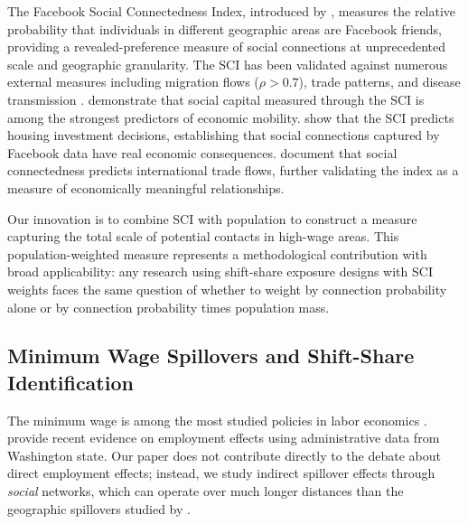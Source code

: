 \documentclass[12pt]{article}
\begin{document}
The Facebook Social Connectedness Index, introduced by \citet{bailey2018social}, measures the relative probability that individuals in different geographic areas are Facebook friends, providing a revealed-preference measure of social connections at unprecedented scale and geographic granularity. The SCI has been validated against numerous external measures including migration flows ($\rho > 0.7$), trade patterns, and disease transmission \citep{bailey2020social}. \citet{chetty2022social} demonstrate that social capital measured through the SCI is among the strongest predictors of economic mobility. \citet{bailey2018house} show that the SCI predicts housing investment decisions, establishing that social connections captured by Facebook data have real economic consequences. \citet{bailey2022social} document that social connectedness predicts international trade flows, further validating the index as a measure of economically meaningful relationships.

Our innovation is to combine SCI with population to construct a measure capturing the total scale of potential contacts in high-wage areas. This population-weighted measure represents a methodological contribution with broad applicability: any research using shift-share exposure designs with SCI weights faces the same question of whether to weight by connection probability alone or by connection probability times population mass.

\subsection{Minimum Wage Spillovers and Shift-Share Identification}

The minimum wage is among the most studied policies in labor economics \citep{neumark2007minimum, dube2010minimum, cengiz2019effect}. \citet{jardim2024} provide recent evidence on employment effects using administrative data from Washington state. Our paper does not contribute directly to the debate about direct employment effects; instead, we study indirect spillover effects through \textit{social} networks, which can operate over much longer distances than the geographic spillovers studied by \citet{dube2014designing}.
\end{document}
